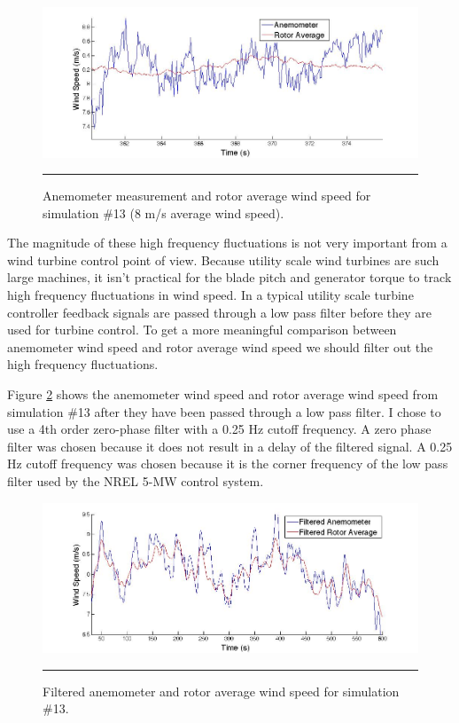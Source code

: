 \begin{figure}[htbp]
	\centering
		\includegraphics[trim = {3cm 0 2.5cm 0}, clip, width = \linewidth]{Figures/ch2Figures/fig2-7.jpg}
		\rule{35em}{0.5pt}
	\caption{Anemometer measurement and rotor average wind speed for simulation \#13 (8 m/s average wind speed).}
	\label{fig2-7}
\end{figure}

The magnitude of these high frequency fluctuations is not very important from a wind turbine control point of view. Because utility scale wind turbines are such large machines, it isn’t practical for the blade pitch and generator torque to track high frequency fluctuations in wind speed. In a typical utility scale turbine controller feedback signals are passed through a low pass filter before they are used for turbine control. To get a more meaningful comparison between anemometer wind speed and rotor average wind speed we should filter out the high frequency fluctuations.

Figure \ref{fig2-8} shows the anemometer wind speed and rotor average wind speed from simulation \#13 after they have been passed through a low pass filter. I chose to use a 4th order zero-phase filter with a 0.25 Hz cutoff frequency. A zero phase filter was chosen because it does not result in a delay of the filtered signal. A 0.25 Hz cutoff frequency was chosen because it is the corner frequency of the low pass filter used by the NREL 5-MW control system. 

\begin{figure}[htbp]
	\centering
		\includegraphics[trim = {3cm 0 2.5cm 0}, clip, width = \linewidth]{Figures/ch2Figures/fig2-8.jpg}
		\rule{35em}{0.5pt}
	\caption{Filtered anemometer and rotor average wind speed for simulation \#13.}
	\label{fig2-8}
\end{figure}

